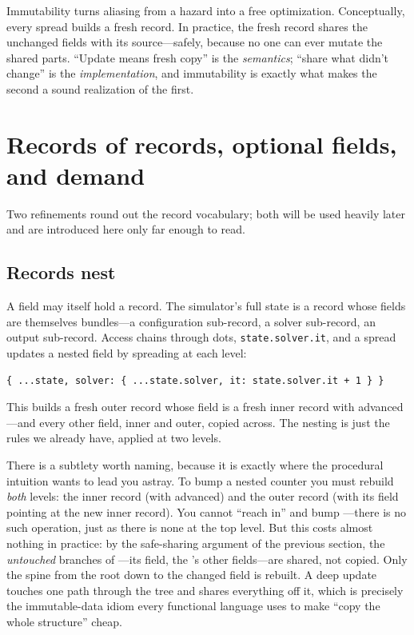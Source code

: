 \begin{keyidea}
Immutability turns aliasing from a hazard into a free optimization. Conceptually,
every spread builds a fresh record. In practice, the fresh record shares the
unchanged fields with its source---safely, because no one can ever mutate the
shared parts. ``Update means fresh copy'' is the \emph{semantics}; ``share what
didn't change'' is the \emph{implementation}, and immutability is exactly what
makes the second a sound realization of the first.
\end{keyidea}

\section{Records of records, optional fields, and demand}

Two refinements round out the record vocabulary; both will be used heavily later
and are introduced here only far enough to read.

\subsection{Records nest}

A field may itself hold a record. The simulator's full state is a record whose
fields are themselves bundles---a configuration sub-record, a solver sub-record,
an output sub-record. Access chains through dots,
\lstinline[style=l4style]|state.solver.it|, and a spread updates a nested field
by spreading at each level:

\begin{lstlisting}[style=l4style]
{ ...state, solver: { ...state.solver, it: state.solver.it + 1 } }
\end{lstlisting}

This builds a fresh outer record whose  field is a fresh inner
record with  advanced---and every other field, inner and outer, copied
across. The nesting is just the rules we already have, applied at two levels.

There is a subtlety worth naming, because it is exactly where the procedural
intuition wants to lead you astray. To bump a nested counter you must rebuild
\emph{both} levels: the inner record (with  advanced) and the outer
record (with its  field pointing at the new inner record). You
cannot ``reach in'' and bump ---there is no such operation,
just as there is none at the top level. But this costs almost nothing in
practice: by the safe-sharing argument of the previous section, the
\emph{untouched} branches of ---its  field, the
's other fields---are shared, not copied. Only the spine from the
root down to the changed field is rebuilt. A deep update touches one path through
the tree and shares everything off it, which is precisely the immutable-data
idiom every functional language uses to make ``copy the whole structure'' cheap.

